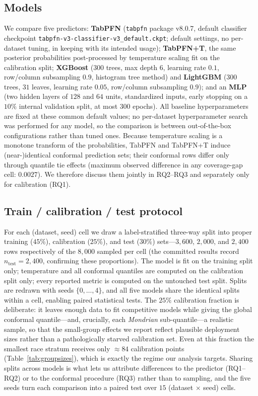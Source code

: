 \documentclass[review,12pt]{elsarticle}
\begin{document}
\subsection{Models}
We compare five predictors: \textbf{TabPFN} (\texttt{tabpfn} package v8.0.7, default classifier checkpoint \texttt{tabpfn-v3-classifier-v3\_default.ckpt}; default settings, no per-dataset tuning, in keeping with its intended usage); \textbf{TabPFN+T}, the same posterior probabilities post-processed by temperature scaling fit on the calibration split; \textbf{XGBoost} ($300$ trees, max depth $6$, learning rate $0.1$, row/column subsampling $0.9$, histogram tree method) and \textbf{LightGBM} ($300$ trees, $31$ leaves, learning rate $0.05$, row/column subsampling $0.9$); and an \textbf{MLP} (two hidden layers of $128$ and $64$ units, standardized inputs, early stopping on a $10\%$ internal validation split, at most $300$ epochs). All baseline hyperparameters are fixed at these common default values; no per-dataset hyperparameter search was performed for any model, so the comparison is between out-of-the-box configurations rather than tuned ones. Because temperature scaling is a monotone transform of the probabilities, TabPFN and TabPFN+T induce (near-)identical conformal prediction sets; their conformal rows differ only through quantile tie effects (maximum observed difference in any coverage-gap cell: $0.0027$). We therefore discuss them jointly in RQ2--RQ3 and separately only for calibration (RQ1).

\subsection{Train / calibration / test protocol}
For each (dataset, seed) cell we draw a label-stratified three-way split into proper training ($45\%$), calibration ($25\%$), and test ($30\%$) sets---$3{,}600$, $2{,}000$, and $2{,}400$ rows respectively of the $8{,}000$ sampled per cell (the committed results record $n_{\mathrm{test}} = 2{,}400$, confirming these proportions). The model is fit on the training split only; temperature and all conformal quantiles are computed on the calibration split only; every reported metric is computed on the untouched test split. Splits are redrawn with seeds $\{0,\dots,4\}$, and all five models share the identical splits within a cell, enabling paired statistical tests. The $25\%$ calibration fraction is deliberate: it leaves enough data to fit competitive models while giving the global conformal quantile---and, crucially, each \emph{Mondrian} sub-quantile---a realistic sample, so that the small-group effects we report reflect plausible deployment sizes rather than a pathologically starved calibration set. Even at this fraction the smallest race stratum receives only $\approx\!84$ calibration points (Table~\ref{tab:groupsizes}), which is exactly the regime our analysis targets. Sharing splits across models is what lets us attribute differences to the predictor (RQ1--RQ2) or to the conformal procedure (RQ3) rather than to sampling, and the five seeds turn each comparison into a paired test over $15$ (dataset $\times$ seed) cells.
\end{document}
